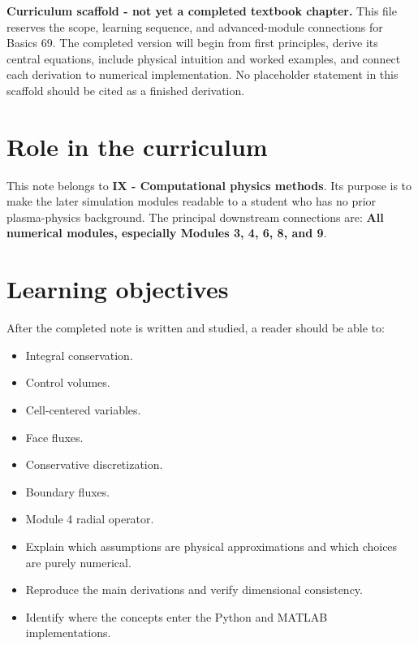 \documentclass[11pt]{article}
\begin{document}

\begin{overviewbox}
\textbf{Curriculum scaffold - not yet a completed textbook chapter.} This file reserves the scope, learning sequence, and advanced-module connections for Basics 69. The completed version will begin from first principles, derive its central equations, include physical intuition and worked examples, and connect each derivation to numerical implementation. No placeholder statement in this scaffold should be cited as a finished derivation.
\end{overviewbox}

\ProjectTOC

\section{Role in the curriculum}
This note belongs to \textbf{IX - Computational physics methods}. Its purpose is to make the later simulation modules readable to a student who has no prior plasma-physics background. The principal downstream connections are: \textbf{All numerical modules, especially Modules 3, 4, 6, 8, and 9}.

\section{Learning objectives}
After the completed note is written and studied, a reader should be able to:
\begin{itemize}[leftmargin=1.6em]
\item Integral conservation.
\item Control volumes.
\item Cell-centered variables.
\item Face fluxes.
\item Conservative discretization.
\item Boundary fluxes.
\item Module 4 radial operator.
\item Explain which assumptions are physical approximations and which choices are purely numerical.
\item Reproduce the main derivations and verify dimensional consistency.
\item Identify where the concepts enter the Python and MATLAB implementations.
\end{itemize}
\end{document}
